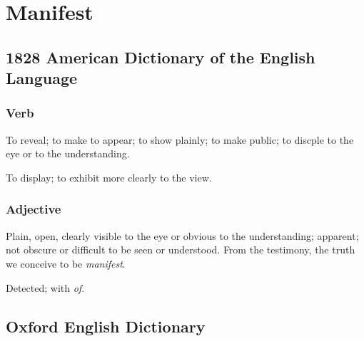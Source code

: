 \section{Manifest}
	\label{MANIFEST}
	

\subsection{1828 American Dictionary of the English Language} %
	\label{MANIFEST-1828}
	
	\subsubsection{Verb}

		\begin{compactitem}
			\item[1] To reveal; to make to appear; to show plainly; to make public; to discple to the eye or to the understanding.
			\item[2] To display; to exhibit more clearly to the view.
		\end{compactitem}
	
	\subsubsection{Adjective}

		\begin{compactitem}
			\item[1] Plain, open, clearly visible to the eye or obvious to the understanding; apparent; not obscure or difficult to be seen or understood. From the testimony, the truth we conceive to be \textit{manifest}.
			\item[2] Detected; with \textit{of}.
		\end{compactitem}

\subsection{Oxford English Dictionary} %
	\label{MANIFEST-OED}
	
